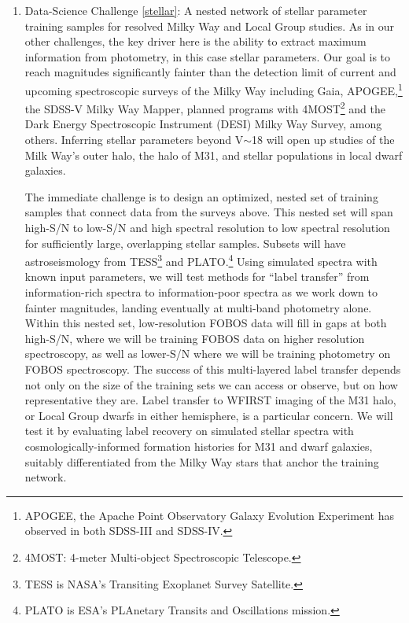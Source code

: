 \documentclass[oneside,11pt]{amsart}
\newcounter{chalno}
\newcommand{\chal}[1]{\refstepcounter{chalno}\label{#1}}
\begin{document}
\begin{enumerate}[rightmargin=0.2cm,leftmargin=0.2cm]

\chal{stellar} 
%
\item[] {\textsf {\large  Data-Science Challenge \ref{stellar}: A nested network of stellar parameter training
samples for resolved Milky Way and Local Group studies.}}  As in our other challenges, the key driver here is the
ability to extract maximum information from photometry, in this case stellar parameters.  Our goal is to reach
magnitudes significantly fainter than the detection limit of current and upcoming spectroscopic surveys of the Milky
Way including Gaia, APOGEE,\footnote{APOGEE, the Apache Point Observatory Galaxy Evolution Experiment has observed in
both SDSS-III and SDSS-IV.} the SDSS-V Milky Way Mapper, planned programs with 4MOST\footnote{4MOST: 4-meter
Multi-object Spectroscopic Telescope.} and the Dark Energy Spectroscopic Instrument (DESI) Milky Way Survey, among
others. Inferring
stellar parameters beyond V$\sim$18 will open up studies of the Milk Way's outer halo, the halo of M31, and stellar
populations in local dwarf galaxies.

The immediate challenge is to design an optimized, nested set of training samples that connect data from the surveys
above.  This nested set will span high-S/N to low-S/N and high spectral resolution to low spectral resolution for
sufficiently large, overlapping stellar samples.  Subsets will have astroseismology from TESS\footnote{TESS is NASA's
Transiting Exoplanet Survey Satellite.} and PLATO.\footnote{PLATO is ESA's PLAnetary Transits and Oscillations
mission.}  Using simulated spectra with known input parameters, we will test methods for ``label transfer'' from
information-rich spectra to information-poor spectra as we work down to fainter magnitudes, landing eventually at
multi-band photometry alone. Within this nested set, low-resolution FOBOS data will fill in gaps at both high-S/N,
where we will be training FOBOS data on higher resolution spectroscopy, as well as lower-S/N where we will be training
photometry on FOBOS spectroscopy.  The success of this multi-layered label transfer depends not only on the size of the
training sets we can access or observe, but on how representative they are.  Label transfer to WFIRST imaging of the
M31 halo, or Local Group dwarfs in either hemisphere, is a particular concern.  We will test it by evaluating label
recovery on simulated stellar spectra with cosmologically-informed formation histories for M31 and dwarf galaxies,
suitably differentiated from the Milky Way stars that anchor the training network.




\end{enumerate}
\end{document}
